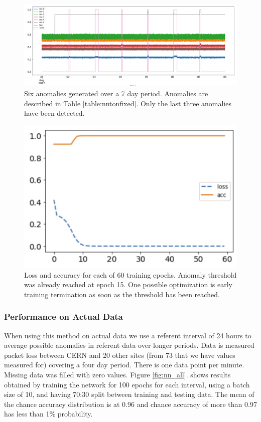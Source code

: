 \documentclass[5p]{elsarticle}
\begin{document}
\begin{figure}[htbp]
    \centering
    \includegraphics[width=\linewidth]{nn_with_auc.png}
    \caption{Six anomalies generated over a 7 day period. Anomalies are described in Table \ref{table:nntonfixed}. Only the last three anomalies have been detected.}
    \label{fig:nnonfixed}
\end{figure}

\begin{figure}[htbp]
    \centering
    \includegraphics[width=0.8\linewidth]{nn_epochs.png}
    \caption{Loss and accuracy for each of 60 training epochs. Anomaly threshold was already reached at epoch 15. One possible optimization is early training termination as soon as the threshold has been reached. }
    \label{fig:loss}
\end{figure}


\subsubsection{Performance on Actual Data}

When using this method on actual data we use a referent interval of 24 hours to average possible anomalies in referent data over longer periods. Data is measured packet loss between CERN and 20 other sites (from 73 that we have values measured for) covering a four day period. There is one data point per minute. Missing data was filled with zero values. Figure \ref{fig:nn_all}. shows results obtained by training the network for 100 epochs for each interval, using a batch size of 10, and having 70:30 split between training and testing data. The mean of the chance accuracy distribution is at 0.96 and chance accuracy of more than 0.97 has less than 1\% probability. 
\end{document}
